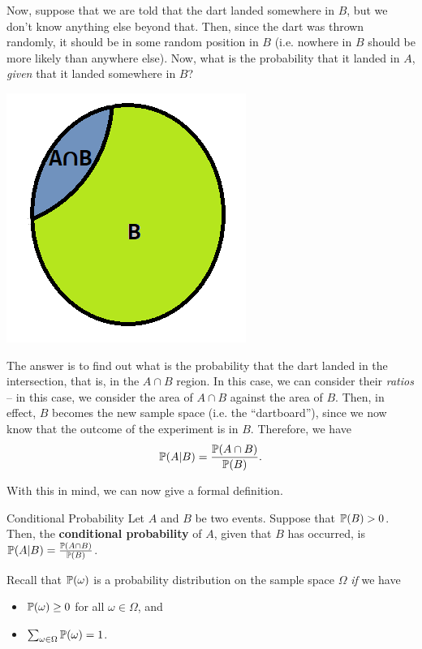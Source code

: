 \begin{mdframed}[]
    Now, suppose that we are told that the dart landed somewhere in $B$, but we don't know anything else beyond that. Then, since the dart was thrown randomly, it should be in some random position in $B$ (i.e. nowhere in $B$ should be more likely than anywhere else). Now, what is the probability that it landed in $A$, \emph{given} that it landed somewhere in $B$?
    \begin{center}
        \includegraphics[scale=0.7]{assets/venn2.png}
    \end{center}
    The answer is to find out what is the probability that the dart landed in the intersection, that is, in the $A \cap B$ region. In this case, we can consider their \emph{ratios} -- in this case, we consider the area of $A \cap B$ against the area of $B$. Then, in effect, $B$ becomes the new sample space (i.e. the ``dartboard''), since we now know that the outcome of the experiment is in $B$. Therefore, we have 
    \[\mathbb{P}(A | B) = \frac{\mathbb{P}(A \cap B)}{\mathbb{P}(B)}.\]
\end{mdframed}
With this in mind, we can now give a formal definition.
\begin{definition}{Conditional Probability}{}
    Let $A$ and $B$ be two events. Suppose that $\mathbb{P}(B) > 0$. Then, the \textbf{conditional probability} of $A$, given that $B$ has occurred, is $\mathbb{P}(A | B) = \frac{\mathbb{P}(A \cap B)}{\mathbb{P}(B)}$.  
\end{definition}
Recall that $\mathbb{P}(\omega)$ is a probability distribution on the sample space $\Omega$ \emph{if} we have 
\begin{itemize}
    \item $\mathbb{P}(\omega) \geq 0$ for all $\omega \in \Omega$, and 
    \item $\sum_{\omega \in \Omega} \mathbb{P}(\omega) = 1$. 
\end{itemize}
